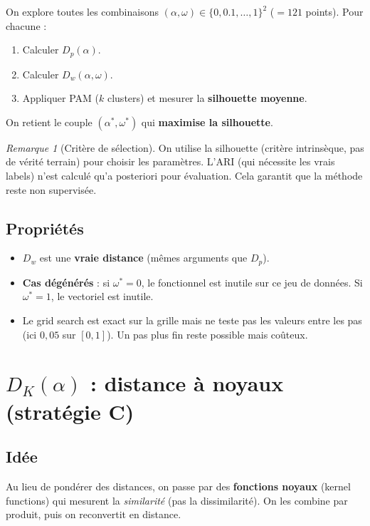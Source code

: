 \documentclass[11pt, a4paper]{article}
\newcommand{\Dp}{D_p}
\newcommand{\Dw}{D_w}
\newcommand{\DK}{D_K}
\theoremstyle{definition}
\theoremstyle{remark}
\newtheorem{remarque}{Remarque}[section]
\begin{document}
On explore toutes les combinaisons
$(\alpha, \omega) \in \{0, 0.1, \ldots, 1\}^2$ ($= 121$ points). Pour chacune :
\begin{enumerate}[nosep]
  \item Calculer $\Dp(\alpha)$.
  \item Calculer $\Dw(\alpha, \omega)$.
  \item Appliquer PAM ($k$ clusters) et mesurer la \textbf{silhouette moyenne}.
\end{enumerate}
On retient le couple $(\alpha^*, \omega^*)$ qui \textbf{maximise la silhouette}.

\begin{remarque}[Critère de sélection]
On utilise la silhouette (critère intrinsèque, pas de vérité terrain) pour
choisir les paramètres. L'ARI (qui nécessite les vrais labels) n'est calculé
qu'a posteriori pour évaluation. Cela garantit que la méthode reste non
supervisée.
\end{remarque}

\subsection{Propriétés}

\begin{itemize}[nosep]
  \item $\Dw$ est une \textbf{vraie distance} (mêmes arguments que $\Dp$).
  \item \textbf{Cas dégénérés} : si $\omega^* = 0$, le fonctionnel est inutile
    sur ce jeu de données. Si $\omega^* = 1$, le vectoriel est inutile.
  \item Le grid search est exact sur la grille mais ne teste pas les valeurs
    entre les pas (ici $0{,}05$ sur $[0,1]$). Un pas plus fin reste possible mais
    coûteux.
\end{itemize}

\section{$\DK(\alpha)$ : distance à noyaux (stratégie C)}

\subsection{Idée}

Au lieu de pondérer des distances, on passe par des
\textbf{fonctions noyaux} (kernel functions) qui mesurent la
\emph{similarité} (pas la dissimilarité). On les combine par produit, puis on
reconvertit en distance.
\end{document}
